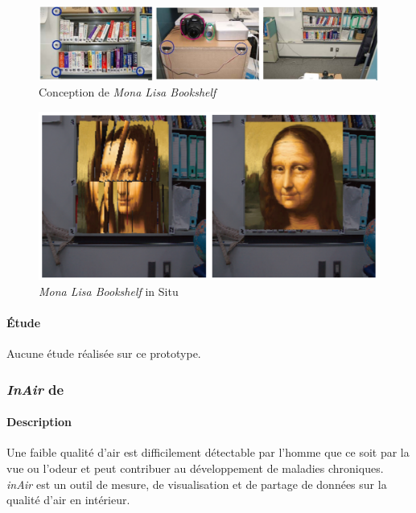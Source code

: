 \documentclass[10pt,a5paper,twoside]{article}
\begin{document}
\begin{figure}
\centering
\includegraphics[]{images/monalisa-screenshot2.png}
\caption{Conception de \emph{Mona Lisa Bookshelf}}\label{fig:monalisa2}
\end{figure}

\begin{figure}
\centering
\includegraphics[]{images/monalisa-screenshot3.png}
\caption{\emph{Mona Lisa Bookshelf} in Situ}\label{fig:monalisa3}
\end{figure}

\paragraph{Étude}\label{uxe9tude-1}

Aucune étude réalisée sur ce prototype.

\subsubsection{\emph{InAir} de
\citet{kim2010inair}}\label{inair-de-kim2010inair}

\paragraph{Description}\label{description-2}

Une faible qualité d'air est difficilement détectable par l'homme que ce
soit par la vue ou l'odeur et peut contribuer au développement de
maladies chroniques. \emph{inAir} est un outil de mesure, de
visualisation et de partage de données sur la qualité d'air en
intérieur.
\end{document}
